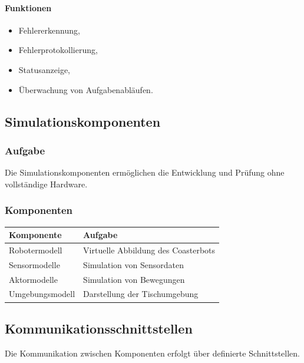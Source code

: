 \paragraph{Funktionen}\label{funktionen-4}

\begin{itemize}
\tightlist
\item
  Fehlererkennung,
\item
  Fehlerprotokollierung,
\item
  Statusanzeige,
\item
  Überwachung von Aufgabenabläufen.
\end{itemize}

\subsection{Simulationskomponenten}\label{simulationskomponenten}

\subsubsection{Aufgabe}\label{aufgabe-11}

Die Simulationskomponenten ermöglichen die Entwicklung und Prüfung ohne
vollständige Hardware.

\subsubsection{Komponenten}\label{komponenten-2}

\begin{longtable}[]{@{}ll@{}}
\toprule\noalign{}
Komponente & Aufgabe \\
\midrule\noalign{}
\endhead
\bottomrule\noalign{}
\endlastfoot
Robotermodell & Virtuelle Abbildung des Coasterbots \\
Sensormodelle & Simulation von Sensordaten \\
Aktormodelle & Simulation von Bewegungen \\
Umgebungsmodell & Darstellung der Tischumgebung \\
\end{longtable}

\subsection{Kommunikationsschnittstellen}\label{kommunikationsschnittstellen}

Die Kommunikation zwischen Komponenten erfolgt über definierte
Schnittstellen.

